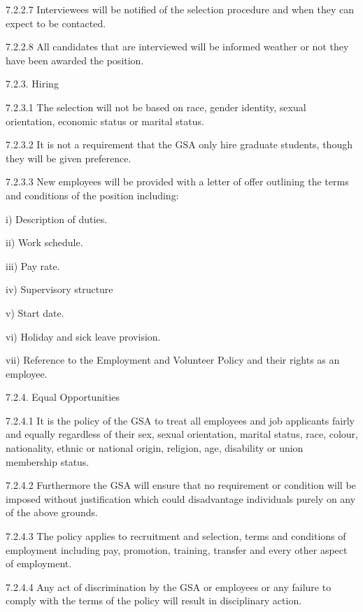  
 
 7.2.2.7 Interviewees will be notified of the selection procedure and when 
 they can expect to be contacted. 
 
 
 
 7.2.2.8 All candidates that are interviewed will be informed weather or 
 not they have been awarded the position. 
 
 
 
 7.2.3. Hiring 
 
 7.2.3.1 The selection will not be based on race, gender identity, 
 sexual orientation, economic status or marital status. 

 7.2.3.2 It is not a requirement that the GSA only hire graduate students, 
 though they will be given preference. 
 
 
 
 7.2.3.3 New employees will be provided with a letter of offer outlining 
 the terms and conditions of the position including: 
 
 i) Description of duties. 
 
 ii) Work schedule. 
 
 iii) Pay rate. 
 
 iv) Supervisory structure 
 
 v) Start date. 
 
 vi) Holiday and sick leave provision. 
 
 vii) Reference to the Employment and Volunteer Policy and 
 their rights as an employee. 

 7.2.4. Equal Opportunities 
 
 7.2.4.1 It is the policy of the GSA to treat all employees and job 
 applicants fairly and equally regardless of their sex, sexual 
 orientation, marital status, race, colour, nationality, ethnic or national 
 origin, religion, age, disability or union membership status. 
 
 
 
 7.2.4.2 Furthermore the GSA will ensure that no requirement or 
 condition will be imposed without justification which could 
 disadvantage individuals purely on any of the above grounds. 
 
 
 
 7.2.4.3 The policy applies to recruitment and selection, terms and 
 conditions of employment including pay, promotion, training, 
 transfer and every other aspect of employment. 
 
 
 
 7.2.4.4 Any act of discrimination by the GSA or employees or any failure to 
 comply with the terms of the policy will result in disciplinary action. 
 
